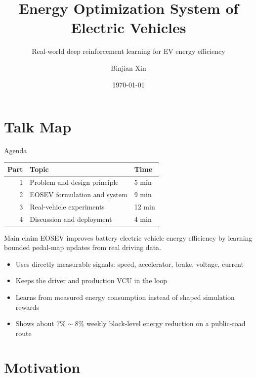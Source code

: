 \documentclass[aspectratio=169,professionalfonts]{beamer}
\author{Binjian Xin}
\date{\today}
\title{Energy Optimization System of Electric Vehicles}
\subtitle{Real-world deep reinforcement learning for EV energy efficiency}
\begin{document}
\maketitle
\section*{Talk Map}
\label{sec:org9a69804}

\begin{frame}[label={sec:org904d5e8}]{Agenda}
\begin{center}
\begin{tabular}{rll}
Part & Topic & Time\\
\hline
1 & Problem and design principle & 5 min\\
2 & EOSEV formulation and system & 9 min\\
3 & Real-vehicle experiments & 12 min\\
4 & Discussion and deployment & 4 min\\
\end{tabular}
\end{center}
\end{frame}
\begin{frame}[label={sec:orgbd5ad4f}]{Main claim}
EOSEV improves battery electric vehicle energy efficiency by learning
bounded pedal-map updates from real driving data.

\begin{itemize}
\item Uses directly measurable signals: speed, accelerator, brake, voltage,
current
\item Keeps the driver and production VCU in the loop
\item Learns from measured energy consumption instead of shaped simulation
rewards
\item Shows about \(7\%\sim8\%\) weekly block-level energy reduction on a
public-road route
\end{itemize}
\end{frame}
\section*{Motivation}
\label{sec:org2835d8b}
\end{document}
